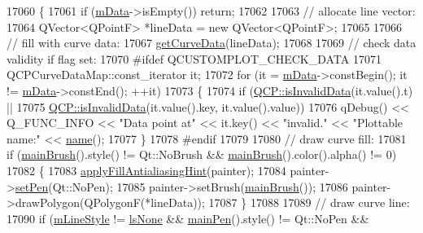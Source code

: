 \begin{DoxyCode}
17060 \{
17061   \textcolor{keywordflow}{if} (\hyperlink{class_q_c_p_curve_a88d533e455bca96004b049e99168731b}{mData}->isEmpty()) \textcolor{keywordflow}{return};
17062   
17063   \textcolor{comment}{// allocate line vector:}
17064   QVector<QPointF> *lineData = \textcolor{keyword}{new} QVector<QPointF>;
17065   
17066   \textcolor{comment}{// fill with curve data:}
17067   \hyperlink{class_q_c_p_curve_afa895f8ba9ae34fea6ecea295fd7b1e5}{getCurveData}(lineData);
17068   
17069   \textcolor{comment}{// check data validity if flag set:}
17070 \textcolor{preprocessor}{#ifdef QCUSTOMPLOT\_CHECK\_DATA}
17071   QCPCurveDataMap::const\_iterator it;
17072   \textcolor{keywordflow}{for} (it = \hyperlink{class_q_c_p_curve_a88d533e455bca96004b049e99168731b}{mData}->constBegin(); it != \hyperlink{class_q_c_p_curve_a88d533e455bca96004b049e99168731b}{mData}->constEnd(); ++it)
17073   \{
17074     \textcolor{keywordflow}{if} (\hyperlink{namespace_q_c_p_a07ab701c05329089f933b9cae2638a63}{QCP::isInvalidData}(it.value().t) ||
17075         \hyperlink{namespace_q_c_p_a07ab701c05329089f933b9cae2638a63}{QCP::isInvalidData}(it.value().key, it.value().value))
17076       qDebug() << Q\_FUNC\_INFO << \textcolor{stringliteral}{"Data point at"} << it.key() << \textcolor{stringliteral}{"invalid."} << \textcolor{stringliteral}{"Plottable name:"} << 
      \hyperlink{class_q_c_p_abstract_plottable_a1affc1972938e4364a9325e4e4e4dcea}{name}();
17077   \}
17078 \textcolor{preprocessor}{#endif}
17079   
17080   \textcolor{comment}{// draw curve fill:}
17081   \textcolor{keywordflow}{if} (\hyperlink{class_q_c_p_abstract_plottable_ae74c123832da180c17e22203e748d9b7}{mainBrush}().style() != Qt::NoBrush && \hyperlink{class_q_c_p_abstract_plottable_ae74c123832da180c17e22203e748d9b7}{mainBrush}().color().alpha() != 0)
17082   \{
17083     \hyperlink{class_q_c_p_abstract_plottable_ac08a480155895e674dbfe5a5670e0ff3}{applyFillAntialiasingHint}(painter);
17084     painter->\hyperlink{class_q_c_p_painter_af9c7a4cd1791403901f8c5b82a150195}{setPen}(Qt::NoPen);
17085     painter->setBrush(\hyperlink{class_q_c_p_abstract_plottable_ae74c123832da180c17e22203e748d9b7}{mainBrush}());
17086     painter->drawPolygon(QPolygonF(*lineData));
17087   \}
17088   
17089   \textcolor{comment}{// draw curve line:}
17090   \textcolor{keywordflow}{if} (\hyperlink{class_q_c_p_curve_ae1f35ae2b15aee8e15bcdfec5be95156}{mLineStyle} != \hyperlink{class_q_c_p_curve_a2710e9f79302152cff794c6e16cc01f1aec1601a191cdf0b4e761c4c66092cc48}{lsNone} && \hyperlink{class_q_c_p_abstract_plottable_a19276ed2382a3a06464417b8788b1451}{mainPen}().style() != Qt::NoPen && 

\end{DoxyCode}
